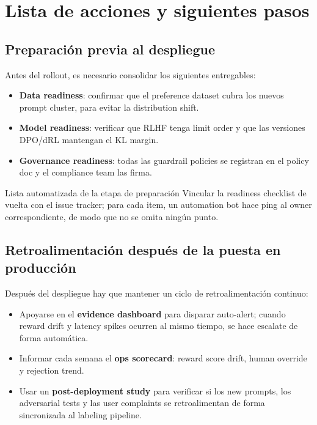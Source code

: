\section{Lista de acciones y siguientes pasos}

\subsection{Preparación previa al despliegue}

Antes del rollout, es necesario consolidar los siguientes entregables:
\begin{itemize}
    \item \textbf{Data readiness}: confirmar que el preference dataset cubra los nuevos prompt cluster, para evitar la distribution shift.
    \item \textbf{Model readiness}: verificar que RLHF tenga limit order y que las versiones DPO/dRL mantengan el KL margin.
    \item \textbf{Governance readiness}: todas las guardrail policies se registran en el policy doc y el compliance team las firma.
\end{itemize}

\begin{knowledgebox}{Lista automatizada de la etapa de preparación}
Vincular la readiness checklist de vuelta con el issue tracker; para cada item, un automation bot hace ping al owner correspondiente, de modo que no se omita ningún punto.
\end{knowledgebox}

\subsection{Retroalimentación después de la puesta en producción}

Después del despliegue hay que mantener un ciclo de retroalimentación continuo:
\begin{itemize}
    \item Apoyarse en el \textbf{evidence dashboard} para disparar auto-alert; cuando reward drift y latency spikes ocurren al mismo tiempo, se hace escalate de forma automática.
    \item Informar cada semana el \textbf{ops scorecard}: reward score drift, human override y rejection trend.
    \item Usar un \textbf{post-deployment study} para verificar si los new prompts, los adversarial tests y las user complaints se retroalimentan de forma sincronizada al labeling pipeline.
\end{itemize}

